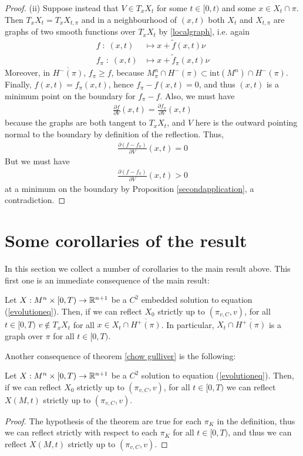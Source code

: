 \begin{proof}
	(ii) Suppose instead that $V\in T_xX_t$  for some $t\in [0, t)$ and some $x\in X_t\cap \pi$. Then $T_xX_t= T_xX_{t, \pi}$ and in a neighbourhood of $(x, t)$ both $X_t$ and $X_{t, \pi}$ are graphs of two smooth functions over $T_xX_t$ by \ref{localgraph}, i.e. again
	\begin{align*}
		f \; : \; (x, t) &\mapsto x+\tilde{f}(x, t)\nu \\
		f_\pi \; : \; (x, t) &\mapsto x+\tilde{f}_\pi(x, t)\nu 
	\end{align*} 
	Moreover, in $\overline{H^-(\pi)}$, $f_\pi\geq f$, because $M^n_\pi\cap H^-(\pi)\subset \mathrm{int}(M^n)\cap H^-(\pi)$. Finally, $f(x, t)=f_\pi (x, t)$, hence $f_\pi-f (x, t)=0$, and thus  $(x, t)$ is a minimum point on the boundary for $f_\pi-f$. Also, we must have
	\begin{align*}
		\frac{\partial f}{\partial V}(x,t)=\frac{\partial f_\pi}{\partial V}(x,t)
	\end{align*}
	because the graphs are both tangent to $T_xX_t$, and $V$ here is the outward pointing normal to the boundary by definition of the reflection. Thus, 
	\begin{align*}
		\frac{\partial (f- f_\pi)}{\partial V}(x,t)=0
	\end{align*}
	But we must have 
	\begin{align*}
		\frac{\partial (f- f_\pi)}{\partial V}(x,t)>0
	\end{align*}
	at a minimum on the boundary by Proposition \ref{secondapplication}, a contradiction.  
\end{proof}


\section{Some corollaries of the result} \label{Some corollaries of the result}
In this section we collect a number of corollaries to the main result above. This first one is an immediate consequence of the main result:
\begin{cor}
	Let $X:M^n\times [0,T) \rightarrow \mathbb{R}^{n+1}$ be a $C^2$ embedded solution to equation (\ref{evolutioneq}). Then, if we can reflect $X_0$ strictly up to $(\pi_{v,C},v)$, for all $t\in [0,T)$ $v\notin T_xX_t$ for all $x\in X_t\cap\overline{H^+(\pi)}$. In particular,  $ X_t\cap\overline{H^+(\pi)}$ is a graph over $\pi$ for all $t\in [0,T)$.\label{graph}
\end{cor}




Another consequence of theorem \ref{chow gulliver} is the following:
\begin{cor}
	Let $X:M^n\times [0,T) \rightarrow \mathbb{R}^{n+1}$ be a $C^2$ solution to equation (\ref{evolutioneq}). Then, if we can reflect $X_0$ strictly up to $(\pi_{v,C},v)$, for all $t\in [0,T)$ we can reflect $X(M, t)$ strictly up to $(\pi_{v,C},v)$. \label{upto}
\end{cor}
\begin{proof}
	The hypothesis of the theorem are true for each $\pi_K$ in the definition, thus we can reflect strictly with respect to each $\pi_K$ for all $t\in[0,T)$, and thus we can reflect $X(M, t)$ strictly up to $(\pi_{v,C},v)$.
\end{proof}

